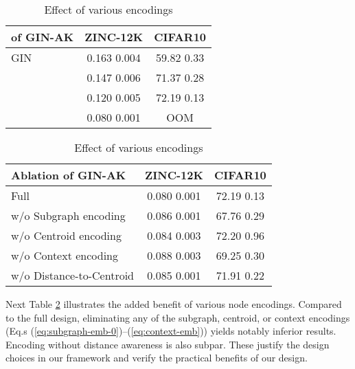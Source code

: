 \begin{table}[!htb]
\fontsize{8}{9.2}\selectfont
\begin{minipage}{.4\linewidth}
      \caption{Effect of various -egonet size.}\label{tab:subgraphs-size}
\centering
        \begin{tabular}{l|cc}
        \toprule
          of \textsf{GIN-AK} & ZINC-12K & CIFAR10 \\
        \midrule  
        GIN & 0.163  0.004 & 59.82  0.33\\
        \midrule 
            & 0.147  0.006 & 71.37  0.28\\
             & 0.120  0.005 & 72.19  0.13\\
         & 0.080  0.001 & OOM\\
        \bottomrule
        \end{tabular}
    \end{minipage}
    
    \begin{minipage}{.6\linewidth}
      \caption{Effect of various encodings }\label{tab:encoding}
        \vspace{-0.1in}
        \centering
        \begin{tabular}{l|cc}
        \toprule
        Ablation of \textsf{GIN-AK} & ZINC-12K & CIFAR10 \\
        \midrule  
        Full & 0.080  0.001 & 72.19  0.13\\
        \midrule 
        w/o Subgraph encoding    & 0.086  0.001 & 67.76  0.29\\
        w/o Centroid encoding    & 0.084  0.003 & 72.20  0.96\\
        w/o Context encoding     & 0.088  0.003 & 69.25  0.30\\
        w/o Distance-to-Centroid & 0.085  0.001 & 71.91  0.22\\
        \bottomrule
        \end{tabular}
    \end{minipage} 
\end{table}

Next Table \ref{tab:encoding} illustrates the added benefit of various node encodings. Compared to the full design, eliminating any of the subgraph, centroid, or context encodings (Eq.s (\ref{eq:subgraph-emb-0})--(\ref{eq:context-emb}))  yields notably inferior results. Encoding without distance awareness is also subpar.  These justify the design choices in our framework and verify the practical benefits of our design. 


